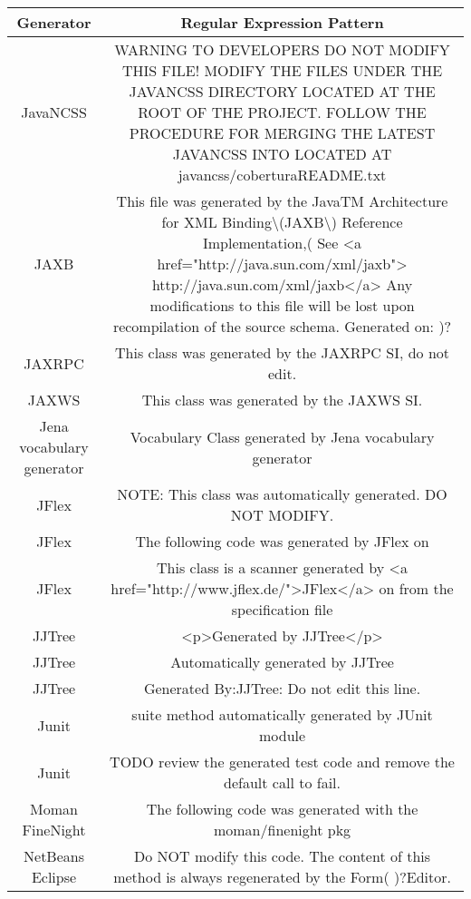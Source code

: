 \setlength{\extrarowheight}{0.2em}
\begin{table}
	\label{table:generatorPatternRepository_QC_01}
	\begin{tabularx}{\textwidth}{c|C}
		\textbf{Generator} & \textbf{Regular Expression Pattern} \\
		\hline			
		JavaNCSS & WARNING TO \project DEVELOPERS DO NOT MODIFY THIS FILE! MODIFY THE FILES UNDER THE JAVANCSS DIRECTORY LOCATED AT THE ROOT OF THE \project PROJECT. FOLLOW THE PROCEDURE FOR MERGING THE LATEST JAVANCSS INTO \project LOCATED AT javancss/coberturaREADME.txt \\
		JAXB & This file was generated by the JavaTM Architecture for XML Binding\textbackslash(JAXB\textbackslash) Reference Implementation,( \version See <a href="http://java.sun.com/xml/jaxb"> http://java.sun.com/xml/jaxb</a> Any modifications to this file will be lost upon recompilation of the source schema. Generated on: \timestamp)? \\
		JAXRPC & This class was generated by the JAXRPC SI, do not edit. \\
		JAXWS & This class was generated by the JAXWS SI. \\
		Jena vocabulary generator & Vocabulary Class generated by Jena vocabulary generator \\
		JFlex & NOTE: This class was automatically generated. DO NOT MODIFY. \\
		JFlex & The following code was generated by JFlex \version on \timestamp  \\
		JFlex & This class is a scanner generated by <a href="http://www.jflex.de/">JFlex</a> \version on \timestamp from the specification file  \\
		JJTree & <p>Generated by JJTree</p> \\
		JJTree & Automatically generated by JJTree \\
		JJTree & Generated By:JJTree: Do not edit this line. \\
		Junit & suite method automatically generated by JUnit module \\
		Junit & TODO review the generated test code and remove the default call to fail. \\
		Moman FineNight & The following code was generated with the moman/finenight pkg \\
		NetBeans Eclipse & Do NOT modify this code. The content of this method is always regenerated by the Form( )?Editor. \\
	\end{tabularx}
\end{table}
\setlength{\extrarowheight}{0em}